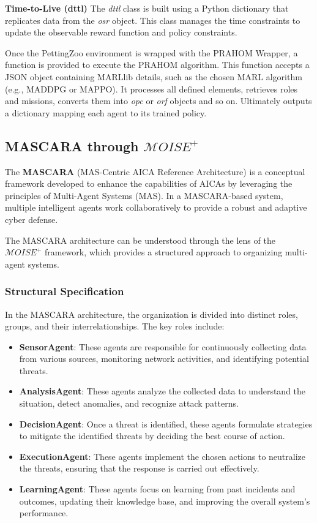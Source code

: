 \documentclass[conference]{IEEEtran}
\newcounter{relation}
\begin{document}
\textbf{Time-to-Live (dttl)} \quad The \textit{dttl} class is built using a Python dictionary that replicates data from the \textit{osr} object. This class manages the time constraints to update the observable reward function and policy constraints.

Once the PettingZoo environment is wrapped with the PRAHOM Wrapper, a function is provided to execute the PRAHOM algorithm. This function accepts a JSON object containing MARLlib details, such as the chosen MARL algorithm (e.g., MADDPG or MAPPO). It processes all defined elements, retrieves roles and missions, converts them into \textit{opc} or \textit{orf} objects and so on. Ultimately outputs a dictionary mapping each agent to its trained policy.


\subsection{MASCARA through $\mathcal{M}OISE^+$}

The \textbf{MASCARA} (MAS-Centric AICA Reference Architecture) is a conceptual framework developed to enhance the capabilities of AICAs by leveraging the principles of Multi-Agent Systems (MAS). In a MASCARA-based system, multiple intelligent agents work collaboratively to provide a robust and adaptive cyber defense.

The MASCARA architecture can be understood through the lens of the $\mathcal{M}OISE^+$ framework, which provides a structured approach to organizing multi-agent systems.

\subsubsection*{Structural Specification}

In the MASCARA architecture, the organization is divided into distinct roles, groups, and their interrelationships. The key roles include:

\begin{itemize}
    \item \textbf{SensorAgent}: These agents are responsible for continuously collecting data from various sources, monitoring network activities, and identifying potential threats.
    \item \textbf{AnalysisAgent}: These agents analyze the collected data to understand the situation, detect anomalies, and recognize attack patterns.
    \item \textbf{DecisionAgent}: Once a threat is identified, these agents formulate strategies to mitigate the identified threats by deciding the best course of action.
    \item \textbf{ExecutionAgent}: These agents implement the chosen actions to neutralize the threats, ensuring that the response is carried out effectively.
    \item \textbf{LearningAgent}: These agents focus on learning from past incidents and outcomes, updating their knowledge base, and improving the overall system's performance.
\end{itemize}
\end{document}

